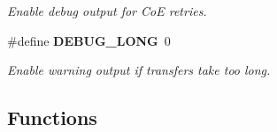 \begin{DoxyCompactItemize}
\begin{DoxyCompactList}\small\item\em Enable debug output for Co\-E retries. \end{DoxyCompactList}\item 
\#define {\bf D\-E\-B\-U\-G\-\_\-\-L\-O\-N\-G}~0\label{fsm__coe_8c_acd46ca922701f9253467bb982265ad59}

\begin{DoxyCompactList}\small\item\em Enable warning output if transfers take too long. \end{DoxyCompactList}\end{DoxyCompactItemize}
\subsection*{Functions}
